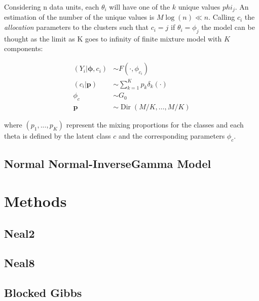 Considering n data units, each $\theta_i$ will have one of the $k$ unique values $phi_j$. An estimation of the number of the unique values is $M\log(n) \ll n$. Calling  $c_i$ the \textit{allocation} parameters to the clusters such that $c_i = j$ if $\theta_i = \phi_j$ the model can be thought as the limit as K goes to infinity of
finite mixture model with $K$ components:

\begin{align*}
            	(Y_{i}|\mathbf{\phi},c_{i})&\sim F(\cdot,\phi_{c_{i}}) \\
            	(c_{i}|\mathit{\mathbf{p}})&\sim \sum_{k=1}^K\mathit{p_k} \delta_k(\cdot) \\
            	\phi_{c} & \sim G_{0} \\
            	\mathbf{p} &\sim \operatorname{Dir}(M/K,\dots,M/K)
\end{align*}
        

where $(p_1,...,p_K)$ represent the mixing proportions for the classes and each theta is defined by the latent class $c$ and the corresponding parameters $\phi_c$.


\subsection{Normal Normal-InverseGamma Model}



\section{Methods}
 

\subsection{Neal2}

\subsection{Neal8}

\subsection{Blocked Gibbs}
